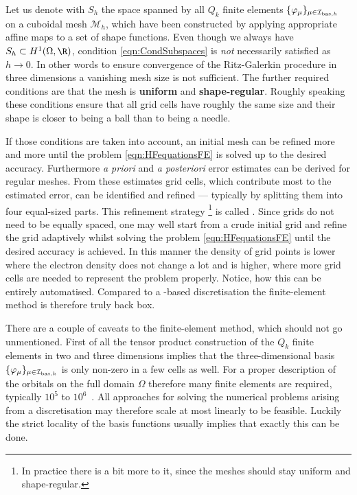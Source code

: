 Let us denote with $S_h$ the
space spanned by all $Q_k$ finite elements $\{\varphi_\mu\}_{\mu\in\mathcal{I}_{\text{bas},h}}$
on a cuboidal mesh $\mathcal{M}_h$,
which have been constructed by applying
appropriate affine maps to a set of shape functions.
Even though we always have $S_h \subset H^1(\Omega, \R)$,
condition \eqref{eqn:CondSubspaces}
is \emph{not} necessarily satisfied as $h \to 0$.
In other words to ensure convergence
of the Ritz-Galerkin procedure in three dimensions
a vanishing mesh size is not sufficient.
The further required conditions are that the mesh
is \textbf{uniform} and \textbf{shape-regular}.
Roughly speaking these conditions ensure that
all grid cells have roughly the same size
and their shape is closer to being a ball than to being a needle.

If those conditions are taken into account,
an initial mesh can be refined more and more
until the \HF problem \eqref{eqn:HFequationsFE}
is solved up to the desired accuracy.
Furthermore \textit{a priori} and \textit{a posteriori} error estimates
can be derived for regular meshes.
From these estimates grid cells,
which contribute most to the estimated error,
can be identified and refined
--- typically by splitting them into four equal-sized parts.
This refinement strategy%
\footnote{%
In practice there is a bit more to it,
since the meshes should stay uniform and shape-regular.
}
is called .
Since \FE grids do not need to be equally spaced,
one may well start from a crude initial grid
and refine the grid adaptively
whilst solving the problem \eqref{eqn:HFequationsFE}
until the desired accuracy is achieved.
In this manner the density of grid points
is lower where the electron density does not change a lot and is higher,
where more grid cells are needed to represent the problem properly.
Notice, how this can be entirely automatised.
Compared to a \cGTO-based discretisation
the finite-element method is therefore truly back box.

There are a couple of caveats to the finite-element method,
which should not go unmentioned.
First of all the tensor product construction of the $Q_k$ finite elements
in two and three dimensions
implies that
the three-dimensional \FE basis $\{\varphi_\mu\}_{\mu\in\mathcal{I}_{\text{bas},h}}$
is only non-zero in a few cells as well.
For a proper description of the \HF orbitals
on the full domain $\Omega$
therefore many finite elements are required,
typically $10^5$ to $10^6$~\cite{Davydov2015}.
All approaches for solving the numerical problems arising from a \FE
discretisation may therefore scale at most linearly to be feasible.
Luckily the strict locality of the \FE basis functions
usually implies that exactly this can be done.


